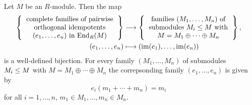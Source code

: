 \begin{theorem}
  \label{theorem: correspondence idempotents and direct decompositions}
  Let $M$ be an $R$-module.
  Then the map
  \begin{align*}
    \left\{
      \begin{tabular}{c}
        complete families of pairwise \\
        orthogonal idempotents  \\
        $(e_1, \dotsc, e_n)$ in $\End_R(M)$
      \end{tabular}
    \right\}
    &\longto
      \left\{
      \begin{tabular}{c}
        families $(M_1, \dotsc, M_n)$ of  \\
        submodules $M_i \moduleleq M$ with \\
        $M = M_1 \oplus \dotsb \oplus M_n$
      \end{tabular}
      \right\},
    \\
                  (e_1, \dotsc, e_n)
    &\longmapsto  (\im(e_1), \dotsc, \im(e_n))
  \end{align*}
  is a well-defined bijection.
  For every family $(M_1, \dotsc, M_n)$ of submodules $M_i \leq M$ with $M = M_1 \oplus \dotsb \oplus M_n$ the correpsonding family $(e_1, \dotsc, e_n)$ is given by
  \[
      e_i(m_1 + \dotsb + m_n)
    = m_i
  \]
  for all $i = 1, \dotsc, n$, $m_1 \in M_1, \dotsc, m_n \in M_n$.
\end{theorem}


